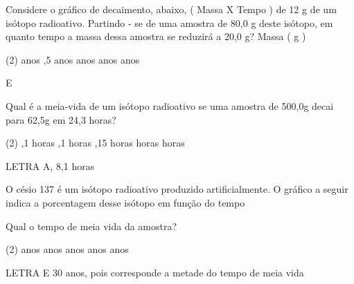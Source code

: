 \documentclass[9 pt]{scrartcl}
\begin{document}
\begin{exercise}[points=1.0]
Considere o gráfico de decaimento, abaixo, ( Massa X Tempo ) de 12 g de um isótopo radioativo. Partindo - se de uma amostra de 80,0 g deste isótopo, em quanto tempo a massa dessa amostra se reduzirá a 20,0 g? Massa ( g )




\begin{choice}(2)
 anos
,5 anos
 anos
 anos
 anos
\end{choice}
\end{exercise}
\begin{solution}
E
\end{solution}




\begin{exercise}[points=1.0]
Qual é a meia-vida de um isótopo radioativo se uma amostra de 500,0g decai para 62,5g em 24,3 horas?

\begin{choice}(2)
,1 horas
,1 horas
,15 horas
 horas
 horas
\end{choice}
\end{exercise}
\begin{solution}
LETRA A, 8,1 horas 
\end{solution}


\begin{exercise}[points=1.0]
O césio 137 é um isótopo radioativo produzido artificialmente. O gráfico a seguir indica a porcentagem desse isótopo em função do tempo


\begin{center}
\end{center}

Qual o tempo de meia vida da amostra?

\begin{choice}(2)
 anos
 anos
 anos
 anos
 anos
\end{choice}
\end{exercise}
\begin{solution}
LETRA E 30 anos, pois corresponde a metade do tempo de meia vida
\end{solution}
\end{document}
